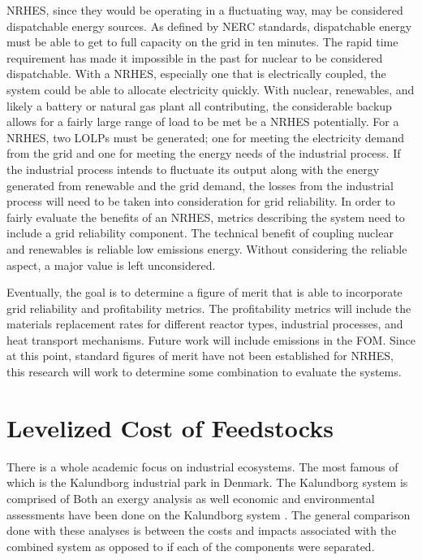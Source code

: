 \documentclass[12pt]{UIdahoMastersThesis}
\begin{document}
NRHES, since they would be operating in a fluctuating way, may be considered dispatchable energy sources. As defined by NERC standards, dispatchable energy must be able to get to full capacity on the grid in ten minutes.  The rapid time requirement has made it impossible in the past for nuclear to be considered dispatchable.  With a NRHES, especially one that is electrically coupled, the system could be able to allocate electricity quickly. With nuclear, renewables, and likely a battery or natural gas plant all contributing, the considerable backup allows for a fairly large range of load to be met be a NRHES potentially. For a NRHES, two LOLPs must be generated; one for meeting the electricity demand from the grid and one for meeting the energy needs of the industrial process.  If the industrial process intends to fluctuate its output along with the energy generated from renewable and the grid demand, the losses from the industrial process will need to be taken into consideration for grid reliability. In order to fairly evaluate the benefits of an NRHES, metrics describing the system need to include a grid reliability component.  The technical benefit of coupling nuclear and renewables is reliable low emissions energy. Without considering the reliable aspect, a major value is left unconsidered.

Eventually, the goal is to determine a figure of merit that is able to incorporate grid reliability and profitability metrics.  The profitability metrics will include the materials replacement rates for different reactor types, industrial processes, and heat transport mechanisms. Future work will include emissions in the FOM. Since at this point, standard figures of merit have not been established for NRHES, this research will work to determine some combination to evaluate the systems.

\section{Levelized Cost of Feedstocks}
There is a whole academic focus on industrial ecosystems.  The most famous of which is the Kalundborg industrial park in Denmark. The Kalundborg system is comprised of  Both an exergy analysis as well economic and environmental assessments have been done on the Kalundborg system \cite{Valero2012,Jacobsen}.  The general comparison done with these analyses is between the costs and impacts associated with the combined system as opposed to if each of the components were separated.
\end{document}
